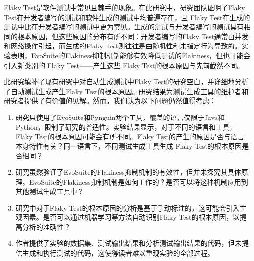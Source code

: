 \documentclass{article}
\newcommand{\flakyTest}{Flaky Test}
\begin{document}
\flakyTest 是软件测试中常见且棘手的现象。在此研究中，研究团队证明了\flakyTest 在开发者编写的测试和软件生成的测试中均普遍存在，且 \flakyTest 在生成的测试中比在开发者编写的测试中更为常见。生成的测试与开发者编写的测试具有相同的根本原因，但这些原因的分布有所不同：开发者编写的\flakyTest 通常由并发和网络操作引起，而生成的\flakyTest 则往往是由随机性和未指定行为导致的。实验表明，EvoSuite的Flakiness抑制机制能够有效降低测试的Flakiness，但也可能会引入新类别的 \flakyTest——产生这些 \flakyTest 的根本原因与先前截然不同。 

此研究填补了现有研究中对自动生成测试中\flakyTest 的研究空白，并详细地分析了自动测试生成产生\flakyTest 的根本原因。研究结果为测试生成工具的维护者和研究者提供了有价值的见解。然而，我们认为以下问题仍然值得考虑：

\begin{enumerate}[label=(\arabic*),noitemsep]
    \item 研究只使用了EvoSuite和Pynguin两个工具，覆盖的语言仅限于Java和Python，限制了研究的普适性。实验结果显示，对于不同的语言和工具，\flakyTest 的根本原因可能会有所不同。\flakyTest 的产生的原因是否与语言本身特性有关？同一语言下，不同测试生成工具生成 \flakyTest 的根本原因是否相同？
    \item 研究虽然验证了EvoSuite的Flakiness抑制机制的有效性，但并未探究其具体原理。EvoSuite的Flakiness抑制机制是如何工作的？是否可以将这种机制应用到其他测试生成工具中？
    \item 研究中对于\flakyTest 的根本原因的分析是基于手动标注的，这可能会引入主观因素。是否可以通过机器学习等方法自动识别\flakyTest 的根本原因，以提高分析的准确性？
    \item 作者提供了实验的数据集、测试输出结果和分析测试输出结果的代码，但未提供生成和执行测试的代码，这使得读者难以重现实验的全部过程。
\end{enumerate}
\end{document}

